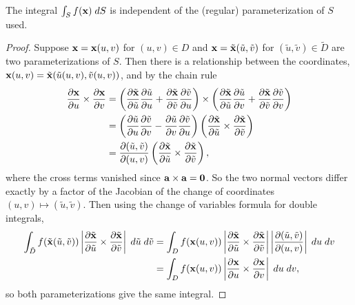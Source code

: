 \documentclass[a4paper]{scrartcl}
\begin{document}
\begin{proposition}
	The integral $\int_S f(\mathbf{x}) \; d S$ is independent of the (regular) parameterization of $S$ used.
\end{proposition}
\begin{proof}
	Suppose $\mathbf{x} = \mathbf{x}(u, v)$ for $(u, v) \in D$ and $\mathbf{x} = \tilde{\mathbf{x}}(\tilde{u}, \tilde{v})$ for $(\tilde{u}, \tilde{v}) \in \tilde{D}$ are two parameterizations of $S$. Then there is a relationship between the coordinates, $\mathbf{x}(u, v) = \tilde{\mathbf{x}}(\tilde{u}(u, v), \tilde{v}(u, v))$, and by the chain rule
	\begin{align*}
		\frac{\partial \mathbf{x}}{\partial u} \times \frac{\partial \mathbf{x}}{\partial v} &= \left(\frac{\partial \tilde{\mathbf{x}}}{\partial \tilde{u}}\frac{\partial \tilde{u}}{\partial u} + \frac{\partial \tilde{\mathbf{x}}}{\partial \tilde{v}}\frac{\partial \tilde{v}}{\partial u}\right) \times \left(\frac{\partial \tilde{\mathbf{x}}}{\partial \tilde{u}}\frac{\partial \tilde{u}}{\partial v} + \frac{\partial \tilde{\mathbf{x}}}{\partial \tilde{v}}\frac{\partial \tilde{v}}{\partial v}\right) \\
		&= \left(\frac{\partial \tilde{u}}{\partial u} \frac{\partial \tilde{v}}{\partial v} - \frac{\partial \tilde{u}}{\partial v} \frac{\partial \tilde{v}}{\partial u}\right) \left(\frac{\partial \tilde{\mathbf{x}}}{\partial \tilde{u}} \times \frac{\partial \tilde{\mathbf{x}}}{\partial \tilde{v}}\right) \\
		&= \frac{\partial(\tilde{u}, \tilde{v})}{\partial (u, v)} \left(\frac{\partial \tilde{\mathbf{x}}}{\partial \tilde{u}} \times \frac{\partial \tilde{\mathbf{x}}}{\partial \tilde{v}}\right),
	\end{align*}
	where the cross terms vanished since $\mathbf{a} \times \mathbf{a} = \mathbf{0}$. So the two normal vectors differ exactly by a factor of the Jacobian of the change of coordinates $(u, v) \mapsto (\tilde{u}, \tilde{v})$. Then using the change of variables formula for double integrals,
	\begin{align*}
		\int_{\tilde{D}} f(\tilde{\mathbf{x}}(\tilde{u}, \tilde{v})) \left|\frac{\partial \tilde{\mathbf{x}}}{\partial \tilde{u}} \times \frac{\partial \tilde{\mathbf{x}}}{\partial \tilde{v}}\right| \; d \tilde{u} \; d \tilde{v}
		&= \int_{D} f(\mathbf{x}(u, v)) \left|\frac{\partial \tilde{\mathbf{x}}}{\partial \tilde{u}} \times \frac{\partial \tilde{\mathbf{x}}}{\partial \tilde{v}}\right| \left|\frac{\partial(\tilde{u}, \tilde{v})}{\partial(u, v)}\right| \; d u \; d v \\
		&= \int_D f(\mathbf{x}(u, v)) \left|\frac{\partial \mathbf{x}}{\partial u} \times \frac{\partial \mathbf{x}}{\partial v}\right| \; d u \; d v,
	\end{align*}
	so both parameterizations give the same integral.
\end{proof}
\end{document}
